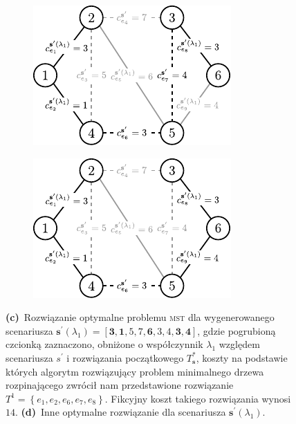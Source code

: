 \begin{figure}[!htbp]
	\ContinuedFloat
	\null\hfill
	\begin{subfigure}[b]{0.32\textwidth}
		\includegraphics[width=\textwidth]{Chapter_IV/INC-MST-example/c1}
		\caption{}
		\label{fig:imstExample:c}
	\end{subfigure}
	\hfill
	\begin{subfigure}[b]{0.32\textwidth}
		\includegraphics[width=\textwidth]{Chapter_IV/INC-MST-example/c2}
		\caption{}
		\label{fig:imstExample:d}
	\end{subfigure}
	\hfill\null
	\caption{
		\textbf{(c)}~Rozwiązanie optymalne problemu \textsc{mst} dla wygenerowanego scenariusza $\textbf{s}^{\prime} \left( \lambda_{1} \right) = \left[ \textbf{3}, \textbf{1}, 5, 7, \textbf{6}, 3, 4, \textbf{3}, \textbf{4} \right]$, gdzie pogrubioną czcionką zaznaczono, obniżone o współczynnik $\lambda_{1}$ względem scenariusza $s^{\prime}$ i rozwiązania początkowego $T^{\ast}_{\textbf{s}}$, koszty na podstawie których algorytm rozwiązujący problem minimalnego drzewa rozpinającego zwrócił nam przedstawione rozwiązanie $T^{1} = \left\{ e_{1}, e_{2}, e_{6}, e_{7}, e_{8} \right\}$. Fikcyjny koszt takiego rozwiązania wynosi $14$.
		\textbf{(d)}~Inne optymalne rozwiązanie dla scenariusza $\textbf{s}^{\prime} \left( \lambda_{1} \right)$.
	}
\end{figure}

